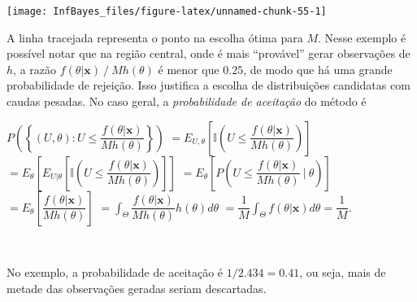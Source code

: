 \documentclass[
]{book}
\newenvironment{Shaded}{\begin{snugshade}}{\end{snugshade}}
\newcommand{\AttributeTok}[1]{\textcolor[rgb]{0.77,0.63,0.00}{#1}}
\newcommand{\FloatTok}[1]{\textcolor[rgb]{0.00,0.00,0.81}{#1}}
\newcommand{\FunctionTok}[1]{\textcolor[rgb]{0.00,0.00,0.00}{#1}}
\newcommand{\NormalTok}[1]{#1}
\newcommand{\SpecialCharTok}[1]{\textcolor[rgb]{0.00,0.00,0.00}{#1}}
\newcommand{\StringTok}[1]{\textcolor[rgb]{0.31,0.60,0.02}{#1}}
\begin{document}
\begin{Shaded}
\end{Shaded}

\begin{center}\texttt{[image: InfBayes\_files/figure-latex/unnamed-chunk-55-1]} \end{center}

A linha tracejada representa o ponto na escolha ótima para \(M\). Nesse exemplo é possível notar que na região central, onde é mais ``provável'' gerar observações de \(h\), a razão \(f(\theta|\boldsymbol x)~/~Mh(\theta)\) é menor que \(0.25\), de modo que há uma grande probabilidade de rejeição. Isso justifica a escolha de distribuições candidatas com caudas pesadas. No caso geral, a \emph{probabilidade de aceitação} do método é

\(P\left(\left\{(U,\theta) : U \leq \dfrac{f(\theta|\boldsymbol x)}{Mh(\theta)}\right\}\right)\) \(=E_{U,\theta}\left[\mathbb{I}\left(U \leq \dfrac{f(\theta|\boldsymbol x)}{Mh(\theta)}\right)\right]\) \(=E_{\theta}\left[{E_{U|\theta}\left[\mathbb{I}\left(U \leq \dfrac{f(\theta|\boldsymbol x)}{Mh(\theta)}\right)\right]}\right]\)
\(=E_{\theta}\left[P\left(U \leq \dfrac{f(\theta|\boldsymbol x)}{Mh(\theta)}~\Big|~\theta\right)\right]\)
\(=E_\theta\left[\dfrac{f(\theta|\boldsymbol x)}{Mh(\theta)}\right]\) \(=\displaystyle\int_\Theta\dfrac{f(\theta|\boldsymbol x)}{Mh(\theta)}h(\theta)d\theta\) \(=\dfrac{1}{M}\displaystyle\int_\Theta f(\theta|\boldsymbol x)d\theta=\dfrac{1}{M}\).

\(~\)

No exemplo, a probabilidade de aceitação é \(1/2.434 = 0.41\), ou seja, mais de metade das observações geradas seriam descartadas.
\end{document}
